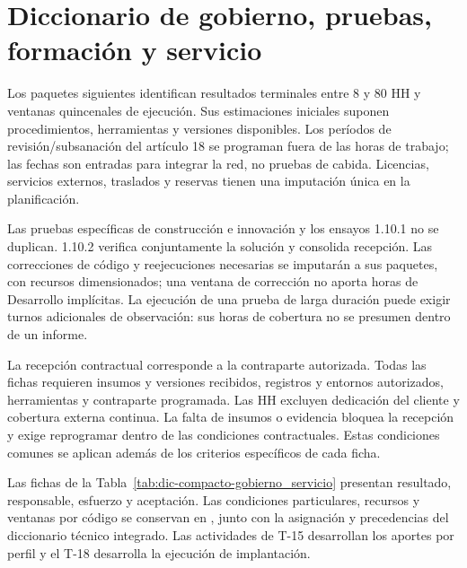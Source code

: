 \section{Diccionario de gobierno, pruebas, formación y servicio}
Los paquetes siguientes identifican resultados terminales entre 8 y 80 HH y ventanas quincenales de ejecución. Sus estimaciones iniciales suponen procedimientos, herramientas y versiones disponibles. Los períodos de revisión/subsanación del artículo 18 se programan fuera de las horas de trabajo; las fechas son entradas para integrar la red, no pruebas de cabida. Licencias, servicios externos, traslados y reservas tienen una imputación única en la planificación.

Las pruebas específicas de construcción e innovación y los ensayos 1.10.1 no se duplican. 1.10.2 verifica conjuntamente la solución y consolida recepción. Las correcciones de código y reejecuciones necesarias se imputarán a sus paquetes, con recursos dimensionados; una ventana de corrección no aporta horas de Desarrollo implícitas. La ejecución de una prueba de larga duración puede exigir turnos adicionales de observación: sus horas de cobertura no se presumen dentro de un informe.

La recepción contractual corresponde a la contraparte autorizada. Todas las fichas requieren insumos y versiones recibidos, registros y entornos autorizados, herramientas y contraparte programada. Las HH excluyen dedicación del cliente y cobertura externa continua. La falta de insumos o evidencia bloquea la recepción y exige reprogramar dentro de las condiciones contractuales. Estas condiciones comunes se aplican además de los criterios específicos de cada ficha.

Las fichas de la Tabla~\ref{tab:dic-compacto-gobierno_servicio} presentan resultado, responsable, esfuerzo y aceptación. Las condiciones particulares, recursos y ventanas por código se conservan en , junto con la asignación y precedencias del diccionario técnico integrado. Las actividades de T-15 desarrollan los aportes por perfil y el T-18 desarrolla la ejecución de implantación.


